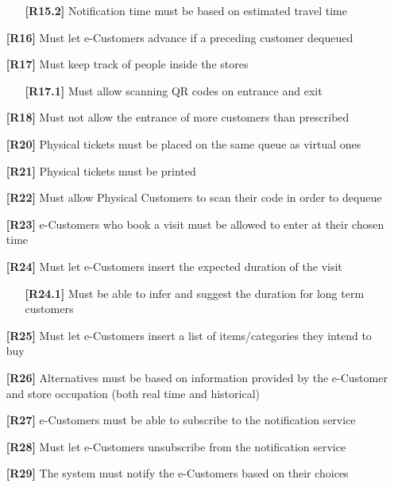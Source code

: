 \begin{itemize}[itemsep=-1mm, topsep=-1mm]
\begin{itemize}[itemsep=-1mm, topsep=-1mm]
		\item [\textbf{[R15.2]}] Notification time must be based on estimated travel time
	\end{itemize}
	\item [\textbf{[R16]}] Must let e-Customers advance if a preceding customer dequeued
	\item [\textbf{[R17]}] Must keep track of people inside the stores
	\begin{itemize}[itemsep=-1mm, topsep=-1mm]
		\item [\textbf{[R17.1]}] Must allow scanning QR codes on entrance and exit
	\end{itemize}
	\item [\textbf{[R18]}] Must not allow the entrance of more customers than prescribed
	\item [\textbf{[R20]}] Physical tickets must be placed on the same queue as virtual ones
	\item [\textbf{[R21]}] Physical tickets must be printed
	\item [\textbf{[R22]}] Must allow Physical Customers to scan their code in order to dequeue
	\item [\textbf{[R23]}] e-Customers who book a visit must be allowed to enter at their chosen time
	\item [\textbf{[R24]}] Must let e-Customers insert the expected duration of the visit
	\begin{itemize}[itemsep=-1mm, topsep=-1mm]
		\item [\textbf{[R24.1]}] Must be able to infer and suggest the duration for long term customers
	\end{itemize}
	\item [\textbf{[R25]}] Must let e-Customers insert a list of items/categories they intend to buy
	\item [\textbf{[R26]}] Alternatives must be based on information provided by the e-Customer and store occupation (both real time and historical)
	\item [\textbf{[R27]}] e-Customers must be able to subscribe to the notification service
	\item [\textbf{[R28]}] Must let e-Customers unsubscribe from the notification service
	\item [\textbf{[R29]}] The system must notify the e-Customers based on their choices
\end{itemize}